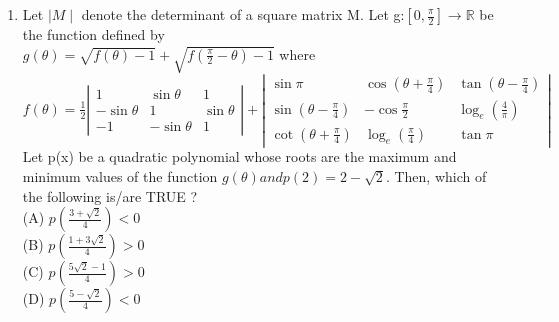 \documentclass{article}
\begin{document}
\begin{enumerate}
	\item Let $\mid M \mid$ denote the determinant of a square matrix M. Let g:$[0,\frac{\pi}{2}]\to\mathbb{R}$  be the function defined by\\
		$g(\theta)=\sqrt{f(\theta)-1}+\sqrt{f(\frac{\pi}{2}-\theta)-1}$ where\\
		$f(\theta) = \frac{1}{2} \left| \begin{matrix}
1 & \sin \theta & 1 \\
-\sin \theta & 1 & \sin \theta \\
-1 & -\sin \theta & 1
\end{matrix} \right| + \left| \begin{matrix}
	\sin \pi & \cos \left( \theta + \frac{\pi}{4} \right) & \tan \left( \theta - \frac{\pi}{4} \right) \\
			\sin \left( \theta - \frac{\pi}{4} \right) & - \cos \frac{\pi}{2} & \log_e \left( \frac{4}{\pi} \right) \\
			\cot \left( \theta + \frac{\pi}{4} \right)& \log_e \left( \frac{\pi}{4} \right) & \tan \pi
\end{matrix} \right|$\\
Let p(x) be a quadratic polynomial whose roots are the maximum and minimum values of the function $g(\theta)and p(2) = 2 -\sqrt{2}$. Then, which of the following is/are TRUE ?\\
(A) $p(\frac{3+\sqrt{2}}{4}) < 0$\\
(B) $p(\frac{1+3\sqrt{2}}{4}) > 0$\\
(C) $p(\frac{5\sqrt{2}-1}{4}) > 0$\\
(D) $p(\frac{5-\sqrt{2}}{4}) < 0$\\
\medskip


\end{enumerate}
\end{document}
